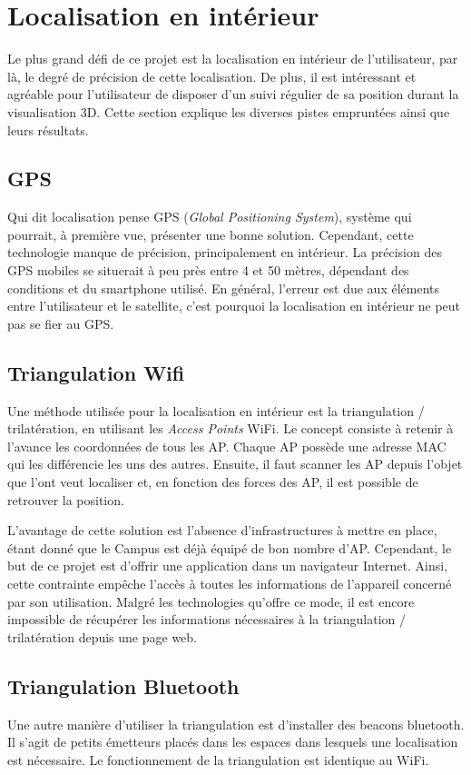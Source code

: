 \section{Localisation en intérieur}
\label{sec:localisation}

Le plus grand défi de ce projet est la localisation en intérieur de l'utilisateur, par là, le degré de précision de cette localisation. De plus, il est intéressant et agréable pour l'utilisateur de disposer d'un suivi régulier de sa position durant la visualisation 3D. Cette section explique les diverses pistes empruntées ainsi que leurs résultats.

\subsection{GPS}
Qui dit localisation pense GPS (\textit{Global Positioning System}), système qui pourrait, à première vue, présenter une bonne solution. Cependant, cette technologie manque de précision, principalement en intérieur. La précision des GPS mobiles se situerait à peu près entre 4 et 50 mètres, dépendant des conditions et du smartphone utilisé. En général, l'erreur est due aux éléments entre l'utilisateur et le satellite, c'est pourquoi la localisation en intérieur ne peut pas se fier au GPS.

\subsection{Triangulation Wifi}
Une méthode utilisée pour la localisation en intérieur est la triangulation / trilatération, en utilisant les \textit{Access Points} WiFi. Le concept consiste à retenir à l'avance les coordonnées de tous les AP. Chaque AP possède une adresse MAC qui les différencie les uns des autres. Ensuite, il faut scanner les AP depuis l'objet que l'ont veut localiser et, en fonction des forces des AP, il est possible de retrouver la position.

L'avantage de cette solution est l'absence d'infrastructures à mettre en place, étant donné que le Campus est déjà équipé de bon nombre d'AP. Cependant, le but de ce projet est d'offrir une application dans un navigateur Internet. Ainsi, cette contrainte  empêche l'accès à toutes les informations de l'appareil concerné par son utilisation. Malgré les technologies qu'offre ce mode, il est encore impossible de récupérer les informations nécessaires à la triangulation / trilatération depuis une page web.

\subsection{Triangulation Bluetooth}
Une autre manière d'utiliser la triangulation est d'installer des beacons bluetooth. Il s'agit de petits émetteurs placés dans les espaces dans lesquels une localisation est nécessaire. Le fonctionnement de la triangulation est identique au WiFi.


